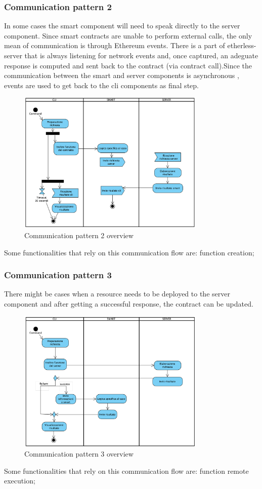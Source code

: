\subsubsection{Communication pattern 2}
In some cases the smart component will need to speak directly to the server component. Since smart contracts are unable to perform external calls, the only mean of communication is through Ethereum events. There is a part of etherless-server that is always listening for network events and, once captured, an adeguate response is computed and sent back to the contract (via contract call).\newline Since the communication between the smart and server components is asynchronous , events are used to get back to the cli components as final step.
\begin{figure}[H]
	\centering
	\includegraphics[width=0.8\textwidth]{res/img/pattern2.png}
	\caption{Communication pattern 2 overview}
\end{figure}
Some functionalities that rely on this communication flow are: function creation;
\newpage
\subsubsection{Communication pattern 3}
There might be cases when a resource needs to be deployed to the server component and after getting a successful response, the contract can be updated.
\begin{figure}[H]
	\centering
	\includegraphics[width=0.8\textwidth]{res/img/pattern3.png}
	\caption{Communication pattern 3 overview}
\end{figure}
Some functionalities that rely on this communication flow are: function remote execution; 